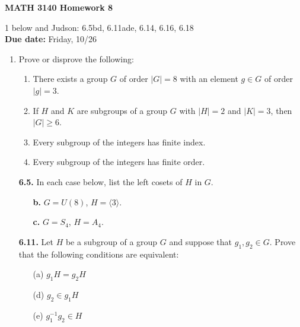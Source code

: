 \documentclass[12pt,reqno]{amsart}
\newcommand{\subject}{MATH\xspace}
\newcommand{\coursenumber}{3140\xspace}
\newcommand{\probskip}{\vskip1cm}
\begin{document}
\thispagestyle{empty}

\noindent \textbf{\subject \coursenumber Homework 8}

\medskip

 1 below and Judson: 6.5bd, 6.11ade, 6.14, 6.16, 6.18\\
{\bf Due date:} Friday, 10/26

\bigskip

\begin{enumerate}[{\bf 1.}]

\item
Prove or disprove the following: 
\begin{enumerate}
\item 
There exists a group $G$ of order $|G| = 8$ with an element
$g \in G$ of order $|g|=3$.

\item
If $H$ and $K$ are subgroups of a group $G$ with $|H|=2$ and $|K|=3$, 
  then $|G|\geq 6$.

\item
Every subgroup of the integers has finite index.

\item 
Every subgroup of the integers has finite order.
\end{enumerate}
\probskip

\item[{\bf 6.5.}]
In each case below, list the left cosets of $H$ in $G$.
\begin{enumerate}
\item[{\bf b.}]
$G = U(8)$, $H = \langle 3 \rangle$.
\item[{\bf c.}]
$G = S_4$, $H = A_4$.
\end{enumerate}

\probskip

\item[{\bf 6.11.}] 
Let $H$ be a subgroup of a group $G$ and suppose that $g_1, g_2 \in G$.  Prove
that the following conditions are equivalent: 
\begin{enumerate}
 
\item[(a)]
$g_1 H = g_2 H$
 
\item[(d)]
$g_2 \in g_1 H$
 
\item[(e)]
$g_1^{-1} g_2 \in H$
\end{enumerate}


\end{enumerate}
\end{document}
